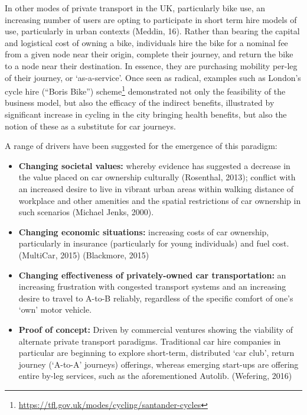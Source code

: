 \documentclass[journal]{IEEEtran}
\begin{document}
In other modes of private transport in the UK, particularly bike use,
an increasing number of users are opting to participate in short term
hire models of use, particularly in urban contexts (Meddin,
16). Rather than bearing the capital and logistical cost of owning a
bike, individuals hire the bike for a nominal fee from a given node
near their origin, complete their journey, and return the bike to a
node near their destination. In essence, they are purchasing mobility
per-leg of their journey, or `as-a-service'. Once seen as radical,
examples such as London’s cycle hire (``Boris Bike'')
scheme\footnote{\url{https://tfl.gov.uk/modes/cycling/santander-cycles}}
demonstrated not only the feasibility of the business model, but also
the efficacy of the indirect benefits, illustrated by significant
increase in cycling in the city bringing health benefits, but also the
notion of these as a substitute for car journeys.

A range of drivers have been suggested for the emergence of this paradigm:

\begin{itemize}
\item {\textbf{Changing societal values:}} whereby evidence has
suggested a decrease in the value placed on car ownership culturally
(Rosenthal, 2013); conflict with an increased desire to live in
vibrant urban areas within walking distance of workplace and other
amenities and the spatial restrictions of car ownership in such
scenarios (Michael Jenks, 2000).
\item {\textbf{Changing economic situations:}} increasing costs of car
ownership, particularly in insurance (particularly for young
individuals) and fuel cost. (MultiCar, 2015) (Blackmore, 2015)
\item {\textbf{Changing effectiveness of privately-owned car
transportation:}} an increasing frustration with congested transport
systems and an increasing desire to travel to A-to-B reliably,
regardless of the specific comfort of one's `own' motor vehicle.
\item {\textbf{Proof of concept:}} Driven by commercial ventures
showing the viability of alternate private transport
paradigms. Traditional car hire companies in particular are beginning
to explore short-term, distributed `car club', return journey
(`A-to-A' journeys) offerings, whereas emerging start-ups are offering
entire by-leg services, such as the aforementioned Autolib. (Wefering,
2016)
\end{itemize}
\end{document}

